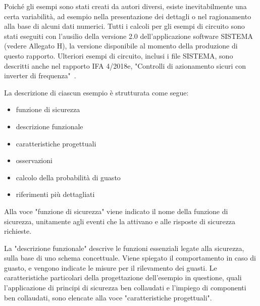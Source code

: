 Poiché gli esempi sono stati creati da autori diversi, esiste inevitabilmente una certa variabilità, ad esempio nella presentazione dei dettagli o nel ragionamento alla base di alcuni dati numerici. Tutti i calcoli per gli esempi di circuito sono stati eseguiti con l'ausilio della versione 2.0 dell'applicazione software SISTEMA (vedere Allegato H), la versione disponibile al momento della produzione di questo rapporto. Ulteriori esempi di circuito, inclusi i file SISTEMA, sono descritti anche nel rapporto IFA 4/2018e, "Controlli di azionamento sicuri con inverter di frequenza"~\cite{werner2019}.

La descrizione di ciascun esempio è strutturata come segue:
\begin{itemize}
    \item funzione di sicurezza
    \item descrizione funzionale
    \item caratteristiche progettuali
    \item osservazioni
    \item calcolo della probabilità di guasto
    \item riferimenti più dettagliati
\end{itemize}

Alla voce "funzione di sicurezza" viene indicato il nome della funzione di sicurezza, unitamente agli eventi che la attivano e alle risposte di sicurezza richieste.

La "descrizione funzionale" descrive le funzioni essenziali legate alla sicurezza, sulla base di uno schema concettuale. Viene spiegato il comportamento in caso di guasto, e vengono indicate le misure per il rilevamento dei guasti.
Le caratteristiche particolari della progettazione dell'esempio in questione, quali l'applicazione di principi di sicurezza ben collaudati e l'impiego di componenti ben collaudati, sono elencate alla voce "caratteristiche progettuali".

